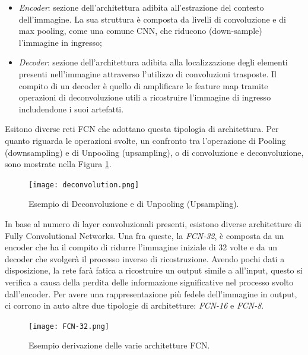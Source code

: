 \begin{itemize}
    \item \emph{Encoder}: sezione dell’architettura adibita all’estrazione del contesto dell’immagine. 
    La sua struttura è composta da livelli di convoluzione e di max 
    pooling, come una comune CNN, che riducono (down-sample) l’immagine 
    in ingresso; 
    \item \emph{Decoder}: sezione dell’architettura adibita alla localizzazione degli elementi 
    presenti nell’immagine attraverso l’utilizzo di convoluzioni trasposte. Il compito 
    di un decoder è quello di amplificare le feature map tramite operazioni 
    di deconvoluzione utili a ricostruire l’immagine di ingresso includendone i 
    suoi artefatti.
\end{itemize}
Esitono diverse reti FCN che adottano questa tipologia di architettura. Per 
quanto riguarda le operazioni svolte, un confronto tra l’operazione di Pooling 
(downsampling) e di Unpooling (upsampling), o di convoluzione e deconvoluzione, 
sono mostrate nella Figura \ref{deconvolution}.
\begin{figure}[H]
    \centering
    \texttt{[image: deconvolution.png]}
    \centering
    \caption{Esempio di Deconvoluzione e di Unpooling (Upsampling).}
    \label{deconvolution}
\end{figure}
In base al numero di layer convoluzionali presenti, esistono diverse architetture 
di Fully Convolutional Networks. Una fra queste, la \emph{FCN-32}, è composta da 
un encoder che ha il compito di ridurre l’immagine iniziale di 32 volte e da un 
decoder che svolgerà il processo inverso di ricostruzione. Avendo pochi dati a 
disposizione, la rete farà fatica a ricostruire un output simile a all’input, questo si 
verifica a causa della perdita delle informazione significative nel processo svolto 
dall’encoder. Per avere una rappresentazione più fedele dell’immagine in output, 
ci corrono in auto altre due tipologie di architetture: \emph{FCN-16} e \emph{FCN-8}.
\begin{figure}[H]
    \centering
    \texttt{[image: FCN-32.png]}
    \centering
    \caption{Esempio derivazione delle varie architetture FCN.}
    \label{FCN-models}
\end{figure}